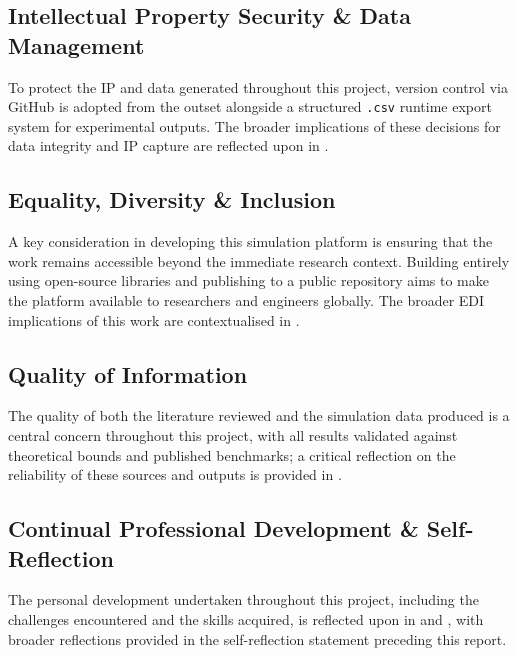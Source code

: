 \documentclass[11pt, a4paper]{report}
\begin{document}
\subsection{Intellectual Property Security \& Data Management}
\label{subsec:skill_ip}

To protect the IP and data generated throughout this project, version control via GitHub is adopted from the outset alongside a structured \texttt{.csv} runtime export system for experimental outputs. The broader implications of these decisions for data integrity and IP capture are reflected upon in .

\subsection{Equality, Diversity \& Inclusion}
\label{subsec:skill_edi}

A key consideration in developing this simulation platform is ensuring that the work remains accessible beyond the immediate research context. Building entirely using open-source libraries and publishing to a public repository aims to make the platform available to researchers and engineers globally. The broader EDI implications of this work are contextualised in .

\subsection{Quality of Information}
\label{subsec:skill_quality}

The quality of both the literature reviewed and the simulation data produced is a central concern throughout this project, with all results validated against theoretical bounds and published benchmarks; a critical reflection on the reliability of these sources and outputs is provided in .

\subsection{Continual Professional Development \& Self-Reflection}
\label{subsec:skill_cpd}

The personal development undertaken throughout this project, including the challenges encountered and the skills acquired, is reflected upon in  and , with broader reflections provided in the self-reflection statement preceding this report.

\end{document}
